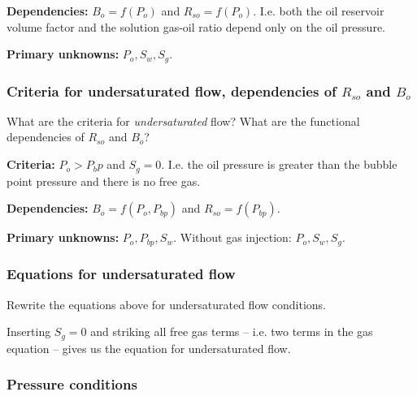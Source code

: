 \noindent \textbf{Dependencies:} $B_o=f(P_o)$ and $R_{so}=f(P_o)$. I.e. both the oil reservoir volume factor and the solution gas-oil ratio depend only on the oil pressure.

\noindent \textbf{Primary unknowns:} $P_o, S_w, S_g$.

\subsubsection{Criteria for undersaturated flow, dependencies of $R_{so}$ and $B_o$} %
\label{ssub:criteria_for_undersaturated_flow_dependencies_of_r__so_and_b_o_}

\begin{question}
  What are the criteria for \emph{undersaturated} flow? What are the functional dependencies of $R_{so}$ and $B_o$?
\end{question}

\noindent \textbf{Criteria:} $P_o > P_bp$ and $S_g = 0$. I.e. the oil pressure is greater than the bubble point pressure and there is no free gas.

\noindent \textbf{Dependencies:} $B_o = f(P_o, P_{bp})$ and $R_{so} = f(P_{bp})$.

\noindent \textbf{Primary unknowns:} $P_o, P_{bp}, S_w$. Without gas injection: $P_o, S_w, S_g$.


\subsubsection{Equations for undersaturated flow} %
\label{ssub:equations_for_undersaturated_flow}

\begin{question}
  Rewrite the equations above for undersaturated flow conditions.
\end{question}

Inserting $S_g = 0$ and striking all free gas terms -- i.e. two terms in the gas equation -- gives us the equation for undersaturated flow.


\subsubsection{Pressure conditions} %
\label{ssub:pressure_conditions}

